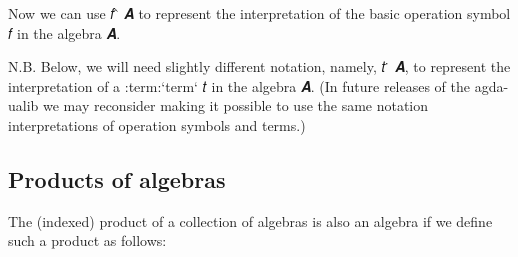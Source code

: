 \documentclass[sigplan,screen]{acmart}
\begin{document}
Now we can use 𝑓 ̂ 𝑨 to represent the interpretation of the basic operation symbol 𝑓 in the algebra 𝑨.

N.B. Below, we will need slightly different notation, namely, 𝑡 ̇ 𝑨, to represent the interpretation of a :term:`term` 𝑡 in the algebra 𝑨. (In future releases of the agda-ualib we may reconsider making it possible to use the same notation interpretations of operation symbols and terms.)

\subsection{Products of algebras}

The (indexed) product of a collection of algebras is also an algebra if we define such a product as follows:

\begin{code}%
%
\>[1]\AgdaSpace{}%
\AgdaSymbol{:}\AgdaSpace{}%
\AgdaSymbol{\{}\AgdaSpace{}%
\AgdaSymbol{:}\AgdaSpace{}%
\AgdaSpace{}%
\AgdaSpace{}%
\AgdaSymbol{\}(}\AgdaSpace{}%
\AgdaSymbol{:}\AgdaSpace{}%
\AgdaSpace{}%
\AgdaSpace{}%
\AgdaSpace{}%
\AgdaSpace{}%
\AgdaSpace{}%
\AgdaSymbol{)}\AgdaSpace{}%
\AgdaSpace{}%
\AgdaSpace{}%
\AgdaSymbol{(}\AgdaSpace{}%
\AgdaSpace{}%
\AgdaSymbol{)}\AgdaSpace{}%
\<%
\\
%
\>[1]\AgdaSpace{}%
\AgdaSpace{}%
\AgdaSymbol{=}%
\>[8]\AgdaSymbol{((}\AgdaSpace{}%
\AgdaSymbol{:}\AgdaSpace{}%
\AgdaSymbol{\AgdaUnderscore{})}\AgdaSpace{}%
\AgdaSpace{}%
\AgdaSpace{}%
\AgdaSpace{}%
\AgdaSpace{}%
\AgdaSymbol{)}\AgdaSpace{}%
\AgdaOperator{\AgdaInductiveConstructor{,}}%
\>[31]\AgdaSpace{}%
\AgdaSpace{}%
\AgdaSpace{}%
\AgdaSpace{}%
\AgdaSpace{}%
\AgdaSymbol{(}\AgdaSpace{}%
\AgdaSpace{}%
\AgdaSpace{}%
\AgdaSymbol{)}\AgdaSpace{}%
\AgdaSpace{}%
\AgdaSpace{}%
\AgdaSpace{}%
\AgdaSpace{}%
\AgdaSpace{}%
\<%
\\
%
\\[\AgdaEmptyExtraSkip]%
%
\>[1]\AgdaSpace{}%
\AgdaSpace{}%
\<%
\end{code}
\end{document}
